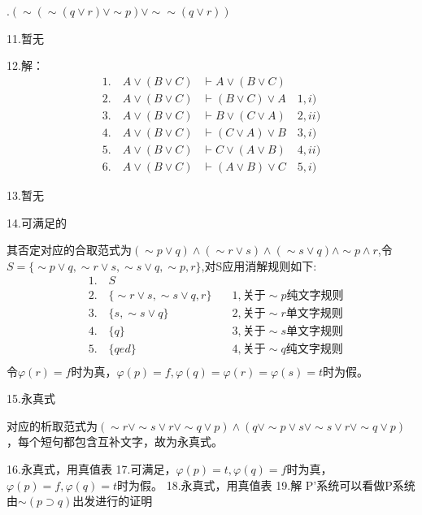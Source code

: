 \documentclass[a4paper]{ctexart}
\begin{document}
.$ \left( \sim \left( \sim \left( q\vee r\right)\vee \sim p \right)\vee \sim \sim \left( q\vee r\right) \right)$\newline

\noindent 11.暂无

\noindent 12.解：
\begin{align*}
    1.\quad A\vee (B\vee C)&\vdash A\vee (B\vee C) \\
    2.\quad A\vee (B\vee C)&\vdash (B\vee C)\vee A\quad 1, i) \\
    3.\quad A\vee (B\vee C)&\vdash B\vee (C\vee A)\quad 2, ii) \\
    4.\quad A\vee (B\vee C)&\vdash (C\vee A) \vee B\quad 3, i) \\
    5.\quad A\vee (B\vee C)&\vdash C\vee (A \vee B)\quad 4, ii) \\
    6.\quad A\vee (B\vee C)&\vdash (A\vee B) \vee C\quad 5, i)
\end{align*}

\noindent 13.暂无

\noindent 14.可满足的

其否定对应的合取范式为$(\sim p\vee q)\wedge(\sim r\vee s)\wedge(\sim s\vee q)\wedge \sim p \wedge r$,令$S=\{\sim p\vee q,\sim r\vee s,\sim s\vee q,\sim p,r\}$,对S应用消解规则如下:
\begin{align*}
    &1.\quad S &\\
    &2.\quad \{\sim r\vee s, \sim s\vee q, r\} \quad &1,\text{关于}\sim p\text{纯文字规则} \\
    &3.\quad \{s, \sim s\vee q\} \quad &2,\text{关于}\sim r\text{单文字规则}\\
    &4.\quad \{q\} \quad &3,\text{关于}\sim s\text{单文字规则}\\
    &5.\quad \{qed\} \quad &4,\text{关于}\sim q\text{纯文字规则}\\
\end{align*}
令$\varphi(r)=f$时为真，$\varphi(p)=f,\varphi(q)=\varphi(r)=\varphi(s)=t$时为假。\newline

\noindent 15.永真式

对应的析取范式为$(\sim r\vee \sim s\vee r\vee \sim q\vee p)\wedge (q\vee \sim p\vee s\vee \sim s\vee r\vee \sim q\vee p)$，每个短句都包含互补文字，故为永真式。\newline

\noindent 16.永真式，用真值表\newline
\noindent 17.可满足，$\varphi(p)=t, \varphi(q)=f$时为真，$\varphi(p)=f, \varphi(q)=t$时为假。\newline
\noindent 18.永真式，用真值表\newline
\noindent 19.解
P'系统可以看做P系统由$\sim(p\supset q)$出发进行的证明
\end{document}

